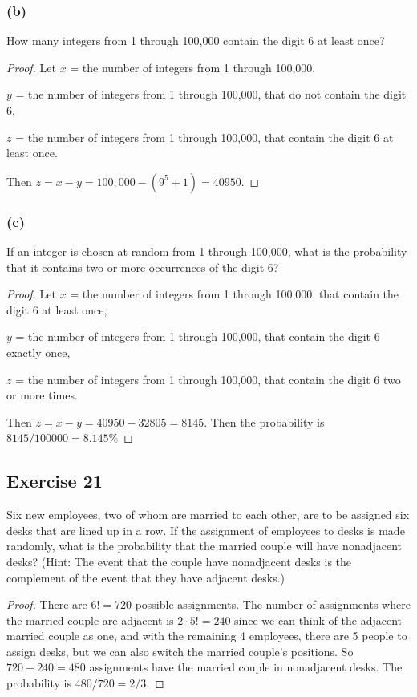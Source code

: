 \documentclass[14pt]{extarticle}
\begin{document}
\subsubsection{(b)}
How many integers from 1 through 100,000 contain the digit 6 at least once?

\begin{proof}
Let $x$ = the number of integers from 1 through 100,000,

$y$ = the number of integers from 1 through 100,000, that do not contain the digit 6,

$z$ = the number of integers from 1 through 100,000, that contain the digit 6 at least once.

Then \(z = x - y = 100,000 - (9^5 + 1) = 40950\).
\end{proof}

\subsubsection{(c)}
If an integer is chosen at random from 1 through 100,000, what is the probability that it contains two or more occurrences of the digit 6?

\begin{proof}
Let $x$ = the number of integers from 1 through 100,000, that contain the digit 6 at least once,

$y$ = the number of integers from 1 through 100,000, that contain the digit 6 exactly once,

$z$ = the number of integers from 1 through 100,000, that contain the digit 6 two or more times.

Then \(z = x - y = 40950 - 32805 = 8145\). Then the probability is \(8145/100000 = 8.145\%\)
\end{proof}

\subsection{Exercise 21}
Six new employees, two of whom are married to each other, are to be assigned six desks that are lined up in a row. If 
the assignment of employees to desks is made randomly, what is the probability that the married couple will have 
nonadjacent desks? (Hint: The event that the couple have nonadjacent desks is the complement of the event that they 
have adjacent desks.)

\begin{proof}
There are \(6! = 720\) possible assignments. The number of assignments where the married couple are adjacent is 
\(2 \cdot 5! = 240\) since we can think of the adjacent married couple as one, and with the remaining 4 employees, 
there are 5 people to assign desks, but we can also switch the married couple's positions. So \(720-240 = 480\) 
assignments have the married couple in nonadjacent desks. The probability is \(480/720 = 2/3\).
\end{proof}
\end{document}
